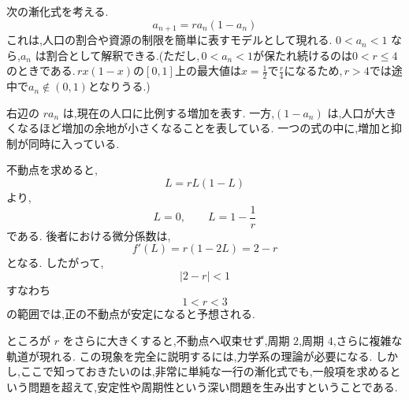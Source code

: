 次の漸化式を考える.
\[
  a_{n+1}=r a_n(1-a_n)
\]
これは,人口の割合や資源の制限を簡単に表すモデルとして現れる.
$0<a_n<1$ なら,$a_n$ は割合として解釈できる.(ただし,\,$0<a_n<1$が保たれ続けるのは$0<r\le4$のときである.\,$rx(1-x)$の$[0,1]$上の最大値は$x=\frac12$で$\frac r4$になるため,\,$r>4$では途中で$a_n\notin(0,1)$となりうる.)

右辺の $ra_n$ は,現在の人口に比例する増加を表す.
一方,$(1-a_n)$ は,人口が大きくなるほど増加の余地が小さくなることを表している.
一つの式の中に,増加と抑制が同時に入っている.

不動点を求めると,
\[
  L=rL(1-L)
\]
より,
\[
  L=0,\qquad L=1-\frac1r
\]
である.
後者における微分係数は,
\[
  f'(L)=r(1-2L)=2-r
\]
となる.
したがって,
\[
  |2-r|<1
\]
すなわち
\[
  1<r<3
\]
の範囲では,正の不動点が安定になると予想される.

ところが $r$ をさらに大きくすると,不動点へ収束せず,周期 $2$,周期 $4$,さらに複雑な軌道が現れる.
この現象を完全に説明するには,力学系の理論が必要になる.
しかし,ここで知っておきたいのは,非常に単純な一行の漸化式でも,一般項を求めるという問題を超えて,安定性や周期性という深い問題を生み出すということである.
